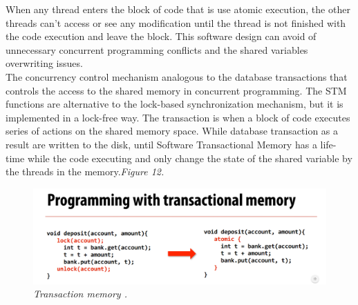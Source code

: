 \documentclass[12pt]{article}
\begin{document}
When any thread enters the block of code that is use atomic execution, the other threads can't access or see any modification until the thread is not finished with the code execution and leave the block. This software design can avoid of unnecessary concurrent programming conflicts and the shared variables overwriting issues. \cite{BDJ}\\


The concurrency control mechanism analogous to the database transactions that controls the access to the shared memory in concurrent programming. The STM functions are alternative to the lock-based synchronization mechanism, but it is implemented in a lock-free way. The transaction is when a block of code executes series of actions on the shared memory space. \citep{STM} While database transaction as a result are written to the disk, until Software Transactional Memory has a life-time while the code executing and only change the state of the shared variable by the threads in the memory.\textit{\color{gray}Figure 12.}

\begin{figure}[h!]
\centering
\includegraphics[scale=0.2]{Pictures/lockvsatomicjpg.png}
\caption{\textit{\color{gray}Transaction memory \cite{TMvsLock}.}}
\end{figure}
\end{document}
